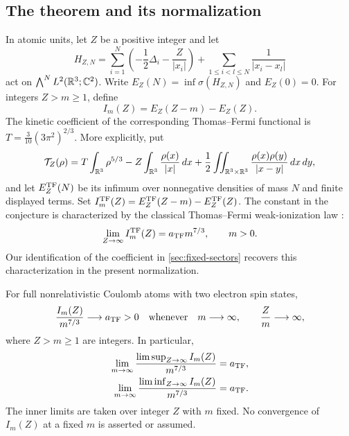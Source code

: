 \subsection{The theorem and its normalization}

In atomic units, let $Z$ be a positive integer and let
\begin{equation}\label{eq:hamiltonian}
 H_{Z,N}
 =\sum_{i=1}^N\left(-\frac12\Delta_i-\frac{Z}{|x_i|}\right)
   +\sum_{1\le i<l\le N}\frac1{|x_i-x_l|}
\end{equation}
act on $\bigwedge^N L^2(\mathbb R^3;\mathbb C^2)$. Write $E_Z(N)=\inf\sigma(H_{Z,N})$
and $E_Z(0)=0$. For integers $Z>m\ge1$, define
\[
 I_m(Z)=E_Z(Z-m)-E_Z(Z).
\]
The kinetic coefficient of the corresponding Thomas--Fermi functional is
$T=\frac3{10}(3\pi^2)^{2/3}$. More explicitly, put
\[
 \mathcal T_Z(\rho)
 =T\int_{\mathbb R^3}\rho^{5/3}
 -Z\int_{\mathbb R^3}\frac{\rho(x)}{|x|}\,dx
 +\frac12\iint_{\mathbb R^3\times\mathbb R^3}
          \frac{\rho(x)\rho(y)}{|x-y|}\,dx\,dy,
\]
and let $E_Z^{\mathrm{TF}}(N)$ be its infimum over nonnegative densities of mass $N$
and finite displayed terms. Set
$I_m^{\mathrm{TF}}(Z)=E_Z^{\mathrm{TF}}(Z-m)-E_Z^{\mathrm{TF}}(Z)$.
The constant in the conjecture is characterized by the classical
Thomas--Fermi weak-ionization law
\cite[Section~6, Corollary~5]{BenilanBrezis2004}:
\begin{equation}\label{eq:tf-constant}
 \lim_{Z\to\infty}I_m^{\mathrm{TF}}(Z)=a_{\mathrm{TF}}m^{7/3},\qquad m>0.
\end{equation}
Our identification of the coefficient in \cref{sec:fixed-sectors}
recovers this characterization in the present normalization.

\begin{theorem}\label{thm:main}
For full nonrelativistic Coulomb atoms with two electron spin states,
\begin{equation}\label{eq:joint-limit}
 \frac{I_m(Z)}{m^{7/3}}\longrightarrow a_{\mathrm{TF}}>0
 \quad\text{whenever}\quad m\longrightarrow\infty,
 \qquad \frac Zm\longrightarrow\infty,
\end{equation}
where $Z>m\ge1$ are integers. In particular,
\begin{align}
 \lim_{m\to\infty}
  \frac{\limsup_{Z\to\infty} I_m(Z)}{m^{7/3}}
   &=a_{\mathrm{TF}},\label{eq:iterated-upper}\\
 \lim_{m\to\infty}
  \frac{\liminf_{Z\to\infty} I_m(Z)}{m^{7/3}}
   &=a_{\mathrm{TF}}.\label{eq:iterated-lower}
\end{align}
The inner limits are taken over integer $Z$ with $m$ fixed. No convergence
of $I_m(Z)$ at a fixed $m$ is asserted or assumed.
\end{theorem}

